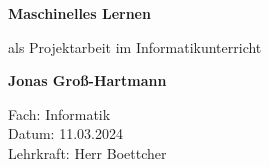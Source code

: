 \begin{titlepage}
    \begin{center}
        \vspace*{1cm}
            
        \Huge
        \textbf{Maschinelles Lernen}
            
        \vspace{0.5cm}
        \LARGE
        als Projektarbeit im Informatikunterricht
            
        \vspace{1.5cm}
            
        \textbf{Jonas Groß-Hartmann}
            
        \vfill
        
        \Large
        Fach: Informatik\\
        Datum: 11.03.2024\\
        Lehrkraft: Herr Boettcher
            
    \end{center}
\end{titlepage}